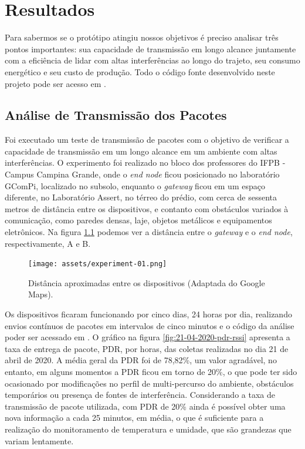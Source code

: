 \chapter{Resultados}
\label{cap:result}
Para sabermos se o protótipo atingiu nossos objetivos é preciso analisar três pontos importantes: sua capacidade de transmissão em longo alcance juntamente com a eficiência de lidar com altas interferências ao longo do trajeto, seu consumo energético e seu custo de produção. Todo o código fonte desenvolvido neste projeto pode ser acesso em \cite{owlify}.

\section{Análise de Transmissão dos Pacotes}
\label{result:transmissao}
Foi executado um teste de transmissão de pacotes com o objetivo de verificar a capacidade de transmissão em um longo alcance em um ambiente com altas interferências. O experimento foi realizado no bloco dos professores do IFPB - Campus Campina Grande, onde o \textit{end node} ficou posicionado no laboratório GComPi, localizado no subsolo, enquanto o \textit{gateway} ficou em um espaço diferente, no Laboratório Assert, no térreo do prédio, com cerca de sessenta metros de distância entre os dispositivos, e contanto com obstáculos variados à comunicação, como paredes densas, laje, objetos metálicos e equipamentos eletrônicos. Na figura \ref{fig:experiment-01} podemos ver a distância entre o \textit{gateway} e o \textit{end node}, respectivamente, A e B.

\begin{figure}[H]
  \centering
  \texttt{[image: assets/experiment-01.png]} 
  \caption{Distância aproximadas entre os dispositivos (Adaptada do Google Maps).}
  \label{fig:experiment-01} 
\end{figure}

Os dispositivos ficaram funcionando por cinco dias, 24 horas por dia, realizando envios contínuos de pacotes em intervalos de cinco minutos e o código da análise poder ser acessado em \cite{owlify_lora_transmitter_test}. O gráfico na figura \ref{fig:21-04-2020-pdr-rssi} apresenta a taxa de entrega de pacote, PDR, por horas, das coletas realizadas no dia 21 de abril de 2020. A média geral da PDR foi de 78,82\%, um valor agradável, no entanto, em alguns momentos a PDR ficou em torno de 20\%, o que pode ter sido ocasionado por modificações no perfil de multi-percurso do ambiente, obstáculos temporários ou presença de fontes de interferência. Considerando a taxa de transmissão de pacote utilizada, com PDR de 20\% ainda é possível obter uma nova informação a cada 25 minutos, em média, o que é suficiente para a realização do monitoramento de temperatura e umidade, que são grandezas que variam lentamente.

